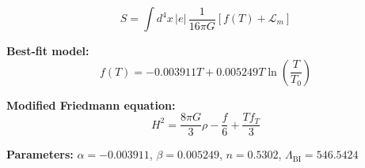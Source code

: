 
\begin{equation}
  S = \int d^4x \, |e| \, \frac{1}{16\pi G} \left[ f(T) + \mathcal{L}_m \right]
\end{equation}

\textbf{Best-fit model:}
\begin{equation}
  f(T) = -0.003911 T + 0.005249 T \ln\!\left(\frac{T}{T_0}\right)
\end{equation}

\textbf{Modified Friedmann equation:}
\begin{equation}
  H^2 = \frac{8\pi G}{3} \rho - \frac{f}{6} + \frac{T f_T}{3}
\end{equation}

\textbf{Parameters:}
$\alpha = -0.003911$, \quad
$\beta = 0.005249$, \quad
$n = 0.5302$, \quad
$\Lambda_{\text{BI}} = 546.5424$